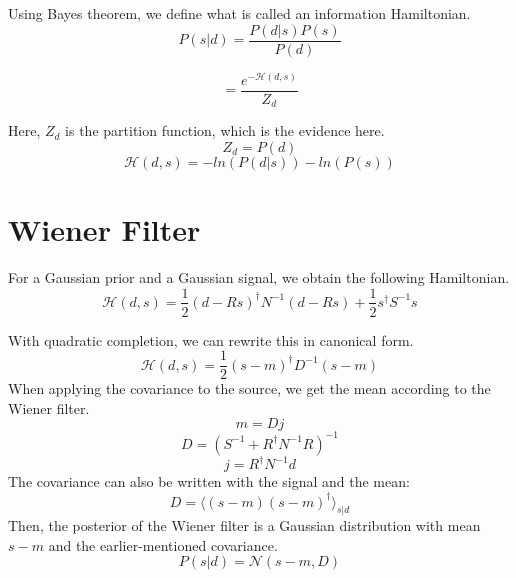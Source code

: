 Using Bayes theorem, we define what is called an information Hamiltonian.
\begin{equation}
    P(s|d) = \frac{P(d|s)P(s)}{P(d)}
\end{equation}
    
\begin{equation}
    = \frac{e^{-\mathcal{H}(d, s)}}{Z_d}
\end{equation}

Here, $Z_d$ is the partition function, which is the evidence here.
\begin{equation}
    Z_d = P(d)
\end{equation}
\begin{equation}
        \mathcal{H}(d, s) = -ln(P(d|s)) - ln(P(s))
\end{equation}

\section{Wiener Filter}
For a Gaussian prior and a Gaussian signal, we obtain the following
Hamiltonian.
\begin{equation}
    \mathcal{H}(d, s) = \frac{1}{2}(d-Rs)^{\dagger}N^{-1}(d-Rs)+\frac{1}{2}s^{\dagger}S^{-1}s
\end{equation}

With quadratic completion, we can rewrite this in canonical form.
\begin{equation}
    \mathcal{H}(d, s) = \frac{1}{2}(s-m)^\dagger D^{-1}(s-m)
\end{equation}
When applying the covariance to the source, we get the mean according to the Wiener filter.
\begin{equation}
    m = Dj
\end{equation}
\begin{equation}
    D =(S^{-1}+R^{\dagger}N^{-1}R)^{-1}
\end{equation}
\begin{equation}
    j =R^{\dagger}N^{-1}d
\end{equation}
The covariance can also be written with the signal and the mean:
\begin{equation}
    D=\langle (s-m)(s-m)^\dagger \rangle_{s|d}
\end{equation}
Then, the posterior of the Wiener filter is a Gaussian distribution with mean $s-m$ and the earlier-mentioned covariance.
\begin{equation}
    P(s|d)=\mathcal{N}(s-m, D)
\end{equation}

